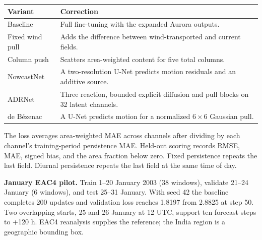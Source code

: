 \documentclass[10pt,a4paper]{article}
\begin{document}
\begin{center}
\begin{tabular}{@{}lp{.70\linewidth}@{}}
\toprule Variant & Correction\\\midrule
Baseline & Full fine-tuning with the expanded Aurora outputs.\\
Fixed wind pull & Adds the difference between wind-transported and current fields.\\
Column push & Scatters area-weighted content for five total columns.\\
NowcastNet & A two-resolution U-Net predicts motion residuals and an additive source.\\
ADRNet & Three reaction, bounded explicit diffusion and pull blocks on 32 latent channels.\\
de B\'ezenac & A U-Net predicts motion for a normalized \(6\times6\) Gaussian pull.\\\bottomrule
\end{tabular}
\end{center}
The loss averages area-weighted MAE across channels after dividing by each channel's training-period persistence MAE. Held-out scoring records RMSE, MAE, signed bias, and the area fraction below zero. Fixed persistence repeats the last field. Diurnal persistence repeats the last field at the same time of day.

\textbf{January EAC4 pilot.} Train 1--20 January 2003 (38 windows), validate 21--24 January (6 windows), and test 25--31 January. With seed 42 the baseline completes 200 updates and validation loss reaches 1.8197 from 2.8825 at step 50. Two overlapping starts, 25 and 26 January at 12 UTC, support ten forecast steps to +120 h. EAC4 reanalysis supplies the reference; the India region is a geographic bounding box.
\end{document}
